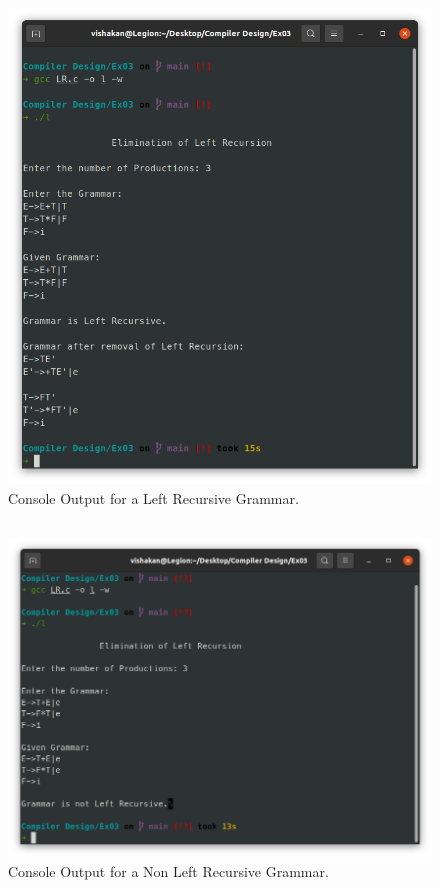 \documentclass[12pt, a4]{article}
\begin{document}
\subsection*{}
\begin{figure}[h]
\centering
\caption{Console Output for a Left Recursive Grammar.}
\includegraphics[scale= 0.5]{Output.png}
\end{figure}

\newpage
\subsection*{}
\begin{figure}[h]
\centering
\caption{Console Output for a Non Left Recursive Grammar.}
\includegraphics[scale= 0.5]{Output2.png}
\end{figure}
\end{document}
